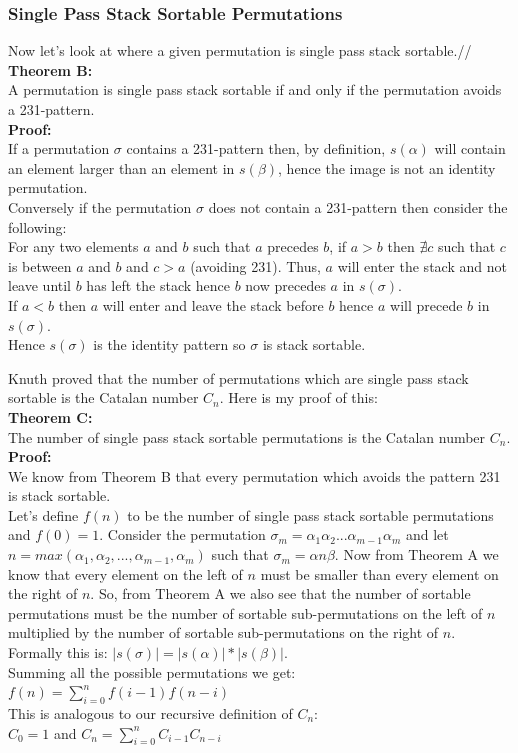 \documentclass[12pt]{article}
\begin{document}
\subsubsection{Single Pass Stack Sortable Permutations}
Now let's look at where a given permutation is single pass stack sortable.//
{\bf Theorem B:}\\
A permutation is single pass stack sortable if and only if the permutation avoids a 231-pattern.\\
{\bf Proof:}\\
If a permutation $\sigma$ contains a 231-pattern then, by definition, $s(\alpha)$ will contain an element larger than an element in $s(\beta)$, hence the image is not an identity permutation.\\
Conversely if the permutation $\sigma$ does not contain a 231-pattern then consider the following:\\
For any two elements $a$ and $b$ such that $a$ precedes $b$, if $a > b$ then $\nexists c$ such that $c$ is between $a$ and $b$ and $c > a$ (avoiding 231). Thus, $a$ will enter the stack and not leave until $b$ has left the stack hence $b$ now precedes $a$ in $s(\sigma)$.\\
If $a < b$ then $a$ will enter and leave the stack before $b$ hence $a$ will precede $b$ in $s(\sigma)$.\\
Hence $s(\sigma)$ is the identity pattern so $\sigma$ is stack sortable. \square

Knuth proved that the number of permutations which are single pass stack sortable is the Catalan number $C_{n}$. Here is my proof of this:\\
{\bf Theorem C:}\\
The number of single pass stack sortable permutations is the Catalan number $C_{n}$.\\
{\bf Proof:}\\
We know from Theorem B that every permutation which avoids the pattern 231 is stack sortable.\\
Let's define $f(n)$ to be the number of single pass stack sortable permutations and $f(0) = 1$. Consider the permutation $\sigma_{m} = \alpha_{1}\alpha_{2}...\alpha_{m-1}\alpha_{m}$ and let $n = max(\alpha_{1}, \alpha_{2}, ..., \alpha_{m-1}, \alpha_{m})$ such that $\sigma_{m} = \alpha n \beta$. Now from Theorem A we know that every element on the left of $n$ must be smaller than every element on the right of $n$. So, from Theorem A we also see that the number of sortable permutations must be the number of sortable sub-permutations on the left of $n$ multiplied by the number of sortable sub-permutations on the right of $n$. Formally this is: $|s(\sigma)| = |s(\alpha)| * |s(\beta)|$.\\
Summing all the possible permutations we get:\\
$f(n) = \sum_{i=0}^{n}f(i-1) f(n-i)$\\
This is analogous to our recursive definition of $C_{n}$:\\
$C_{0} = 1$ and $C_{n} = \sum_{i=0}^{n}C_{i-1} C_{n-i}$\\
\square
\end{document}
